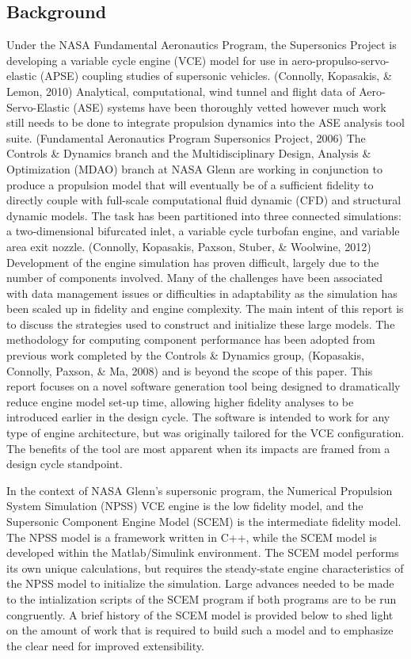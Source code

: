 \documentclass[heading.tex]{subfiles}
\begin{document}
\subsection{Background}
Under the NASA Fundamental Aeronautics Program, the Supersonics Project is developing a variable cycle engine (VCE) model for use in aero-propulso-servo-elastic (APSE) coupling studies of supersonic vehicles. (Connolly, Kopasakis, \& Lemon, 2010) Analytical, computational, wind tunnel and flight data of Aero-Servo-Elastic (ASE) systems have been thoroughly vetted however much work still needs to be done to integrate propulsion dynamics into the ASE analysis tool suite. (Fundamental Aeronautics Program Supersonics Project, 2006)
The Controls \& Dynamics branch and the Multidisciplinary Design, Analysis \& Optimization (MDAO) branch at NASA Glenn are working in conjunction to produce a propulsion model that will eventually be of a sufficient fidelity to directly couple with full-scale computational fluid dynamic (CFD) and structural dynamic models. The task has been partitioned into three connected simulations: a two-dimensional bifurcated inlet, a variable cycle turbofan engine, and variable area exit nozzle. (Connolly, Kopasakis, Paxson, Stuber, \& Woolwine, 2012) 
Development of the engine simulation has proven difficult, largely due to the number of components involved. Many of the challenges have been associated with data management issues or difficulties in adaptability as the simulation has been scaled up in fidelity and engine complexity. The main intent of this report is to discuss the strategies used to construct and initialize these large models.  The methodology for computing component performance has been adopted from previous work completed by the Controls \& Dynamics group, (Kopasakis, Connolly, Paxson, \& Ma, 2008) and is beyond the scope of this paper.
This report focuses on a novel software generation tool being designed to dramatically reduce engine model set-up time, allowing higher fidelity analyses to be introduced earlier in the design cycle. The software is intended to work for any type of engine architecture, but was originally tailored for the VCE configuration. The benefits of the tool are most apparent when its impacts are framed from a design cycle standpoint.

	In the context of NASA Glenn’s supersonic program, the Numerical Propulsion System Simulation (NPSS) VCE engine is the low fidelity model, and the Supersonic Component Engine Model (SCEM) is the intermediate fidelity model. The NPSS model is a framework written in C++, while the SCEM model is developed within the Matlab/Simulink environment. The SCEM model performs its own unique calculations, but requires the steady-state engine characteristics of the NPSS model to initialize the simulation. Large advances needed to be made to the intialization scripts of the SCEM program if both programs are to be run congruently. A brief history of the SCEM model is provided below to shed light on the amount of work that is required to build such a model and to emphasize the clear need for improved extensibility.  
\end{document}
